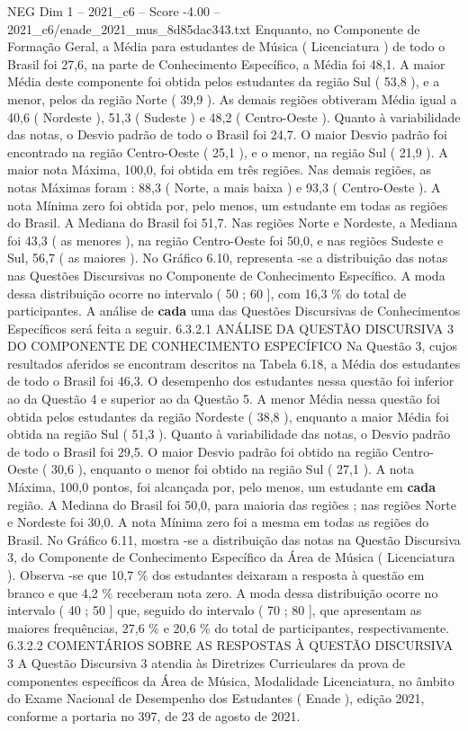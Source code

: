 \begin{textsample}{NEG Dim 1 – 2021\_c6 – Score -4.00 – 2021\_c6/enade\_2021\_mus\_8d85dac343.txt}
Enquanto, no Componente de Formação Geral, a Média para estudantes de Música ( Licenciatura ) de todo o Brasil foi 27,6, na parte de Conhecimento Específico, a Média foi 48,1.
A maior Média deste componente foi obtida pelos estudantes da região Sul ( 53,8 ), e a menor, pelos da região Norte ( 39,9 ).
As demais regiões obtiveram Média igual a 40,6 ( Nordeste ), 51,3 ( Sudeste ) e 48,2 ( Centro-Oeste ).
Quanto à variabilidade das notas, o Desvio padrão de todo o Brasil foi 24,7.
O maior Desvio padrão foi encontrado na região Centro-Oeste ( 25,1 ), e o menor, na região Sul ( 21,9 ).
A maior nota Máxima, 100,0, foi obtida em três regiões.
Nas demais regiões, as notas Máximas foram : 88,3 ( Norte, a mais baixa ) e 93,3 ( Centro-Oeste ).
A nota Mínima zero foi obtida por, pelo menos, um estudante em todas as regiões do Brasil.
A Mediana do Brasil foi 51,7.
Nas regiões Norte e Nordeste, a Mediana foi 43,3 ( as menores ), na região Centro-Oeste foi 50,0, e nas regiões Sudeste e Sul, 56,7 ( as maiores ).
No Gráfico 6.10, representa -se a distribuição das notas nas Questões Discursivas no Componente de Conhecimento Específico.
A moda dessa distribuição ocorre no intervalo ( 50 ; 60 ], com 16,3 \% do total de participantes.
A análise de \textbf{cada} uma das Questões Discursivas de Conhecimentos Específicos será feita a seguir. 6.3.2.1 ANÁLISE DA QUESTÃO DISCURSIVA 3 DO COMPONENTE DE CONHECIMENTO ESPECÍFICO Na Questão 3, cujos resultados aferidos se encontram descritos na Tabela 6.18, a Média dos estudantes de todo o Brasil foi 46,3.
O desempenho dos estudantes nessa questão foi inferior ao da Questão 4 e superior ao da Questão 5.
A menor Média nessa questão foi obtida pelos estudantes da região Nordeste ( 38,8 ), enquanto a maior Média foi obtida na região Sul ( 51,3 ).
Quanto à variabilidade das notas, o Desvio padrão de todo o Brasil foi 29,5.
O maior Desvio padrão foi obtido na região Centro-Oeste ( 30,6 ), enquanto o menor foi obtido na região Sul ( 27,1 ).
A nota Máxima, 100,0 pontos, foi alcançada por, pelo menos, um estudante em \textbf{cada} região.
A Mediana do Brasil foi 50,0, para maioria das regiões ; nas regiões Norte e Nordeste foi 30,0.
A nota Mínima zero foi a mesma em todas as regiões do Brasil.
No Gráfico 6.11, mostra -se a distribuição das notas na Questão Discursiva 3, do Componente de Conhecimento Específico da Área de Música ( Licenciatura ).
Observa -se que 10,7 \% dos estudantes deixaram a resposta à questão em branco e que 4,2 \% receberam nota zero.
A moda dessa distribuição ocorre no intervalo ( 40 ; 50 ] que, seguido do intervalo ( 70 ; 80 ], que apresentam as maiores frequências, 27,6 \% e 20,6 \% do total de participantes, respectivamente. 6.3.2.2 COMENTÁRIOS SOBRE AS RESPOSTAS À QUESTÃO DISCURSIVA 3 A Questão Discursiva 3 atendia às Diretrizes Curriculares da prova de componentes específicos da Área de Música, Modalidade Licenciatura, no âmbito do Exame Nacional de Desempenho dos Estudantes ( Enade ), edição 2021, conforme a portaria no 397, de 23 de agosto de 2021.

\end{textsample}
